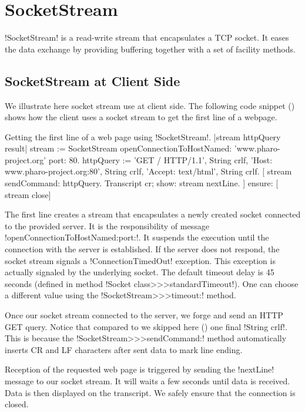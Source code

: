 \documentclass[a4paper,10pt,twoside]{book}
\begin{document}
\section{SocketStream}
\label{sec:socketStream}
\ct!SocketStream! is a read-write stream that encapsulates a TCP socket.
It eases the data exchange by providing buffering together with a set of facility methods.

\subsection{SocketStream at Client Side}
We illustrate here socket stream use at client side.
The following code snippet () shows how the client uses a socket stream to get the first line of a webpage.

\begin{script}{Getting the first line of a web page using \ct!SocketStream!.}
	|stream httpQuery result|
	stream := SocketStream 
			openConnectionToHostNamed: 'www.pharo-project.org' 
			port: 80.
	httpQuery := 'GET / HTTP/1.1', String crlf, 
		'Host: www.pharo-project.org:80', String crlf, 
		'Accept: text/html', String crlf.
	[
		stream sendCommand: httpQuery.
		Transcript cr; show: stream nextLine.
	] ensure: [
		stream close]
\end{script}

The first line creates a stream that encapsulates a newly created socket connected to the provided server.
It is the responsibility of message \ct!openConnectionToHostNamed:port:!.
It suspends the execution until the connection with the server is established.
If the server does not respond, the socket stream signals a \ct!ConnectionTimedOut! exception.
This exception is actually signaled by the underlying socket.
The default timeout delay is 45 seconds (defined in method \ct!Socket class>>>standardTimeout!).
One can choose a different value using the \ct!SocketStream>>>timeout:! method.

Once our socket stream connected to the server, we forge and send an HTTP GET query.
Notice that compared to  we skipped here () one final \ct!String crlf!.
This is because the \ct!SocketStream>>>sendCommand:! method automatically inserts CR and LF characters after sent data to mark line ending.

Reception of the requested web page is triggered by sending the \ct!nextLine! message to our socket stream.
It will waits a few seconds until data is received.
Data is then displayed on the transcript.
We safely ensure that the connection is closed.
\end{document}
